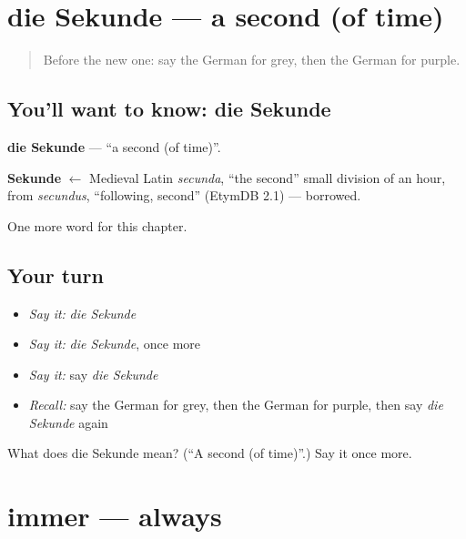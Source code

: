 \section[die Sekunde]{die Sekunde — a second (of time)}

\label{lesson:GE-C94-sekunde}



\begin{quote}
Before the new one: say the German for grey, then the German for purple.
\end{quote}

\subsection*{You'll want to know: die Sekunde}
\textbf{die Sekunde} — \textquotedblleft{}a second (of time)\textquotedblright{}.

\begin{cousinweb}
\textbf{Sekunde} $\leftarrow$ Medieval Latin \emph{secunda}, \textquotedblleft{}the second\textquotedblright{} small division of an hour, from \emph{secundus}, \textquotedblleft{}following, second\textquotedblright{} (EtymDB 2.1) — borrowed.
\end{cousinweb}

\begin{grammarlens}[title={What you've built}]
One more word for this chapter.
\end{grammarlens}

\subsection*{Your turn}
\begin{itemize}
\raggedright
  \item \emph{Say it:} \emph{die Sekunde}
  \item \emph{Say it:} \emph{die Sekunde}, once more
  \item \emph{Say it:} say \emph{die Sekunde}
  \item \emph{Recall:} say the German for grey, then the German for purple, then say \emph{die Sekunde} again
\end{itemize}

\begin{tcolorbox}[breakable,colback=teal!4,colframe=teal!35!black,title={Before you move on}]
What does die Sekunde mean? (\textquotedblleft{}A second (of time)\textquotedblright{}.) Say it once more.
\end{tcolorbox}
\section[immer]{immer — always}


